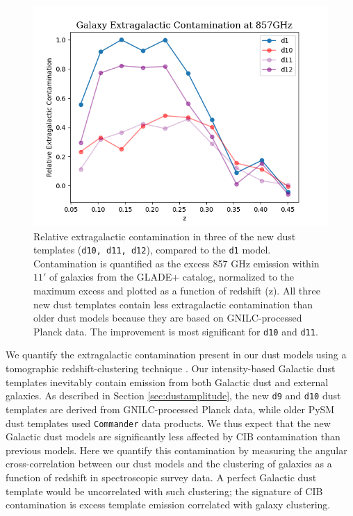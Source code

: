 \documentclass[twocolumn]{aastex631}
\begin{document}
\begin{figure}[h!]
    \centering
    \includegraphics[width=\columnwidth]{figures/EGC_galaxy@857Part_0-1.png}
    \caption{Relative extragalactic contamination in three of the new dust templates (\texttt{d10, d11, d12}), compared to the \texttt{d1} model. Contamination is quantified as the excess 857 GHz emission within $11'$ of galaxies from the GLADE+ catalog, normalized to the maximum excess and plotted as a function of redshift (z). All three new dust templates contain less extragalactic contamination than older dust models because they are based on GNILC-processed Planck data. The improvement is most significant for \texttt{d10} and \texttt{d11}.  }
    \label{fig:extragal_contamination}
\end{figure}


We quantify the extragalactic contamination present in our dust models using a tomographic redshift-clustering technique \citep{Schmidt:2015, Chiang:2019}. Our intensity-based Galactic dust templates inevitably contain emission from both Galactic dust and external galaxies. As described in Section \ref{sec:dustamplitude}, the new \texttt{d9} and \texttt{d10} dust templates are derived from GNILC-processed Planck data, while older PySM dust templates used \texttt{Commander} data products. We thus expect that the new Galactic dust models are significantly less affected by CIB contamination than previous models. Here we quantify this contamination by measuring the angular cross-correlation between our dust models and the clustering of galaxies as a function of redshift in spectroscopic survey data. A perfect Galactic dust template would be uncorrelated with such clustering; the signature of CIB contamination is excess template emission correlated with galaxy clustering. 
\end{document}
